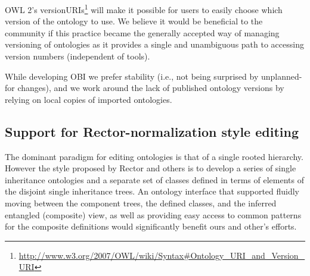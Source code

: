 \documentclass{elsart}       %
\begin{document}
OWL 2's versionURIs\footnote{\url{http://www.w3.org/2007/OWL/wiki/Syntax#Ontology_URI_and_Version_URI}} will make it possible for users to easily choose which version of the ontology to use.
We believe it would be beneficial to the community if this practice became the generally accepted way of managing versioning of ontologies as it provides a single and unambiguous path to accessing version numbers (independent of tools). 

While developing OBI we prefer stability (i.e., not being surprised by unplanned-for changes), and we work around the lack of published ontology versions by relying on local copies of imported ontologies.

\subsection{Support for Rector-normalization style editing}

The dominant paradigm for editing ontologies is that of a single rooted hierarchy.
However the style proposed by Rector and others is to develop a series of single inheritance ontologies and a separate set of classes defined in terms of elements of the disjoint single inheritance trees.
An ontology interface that supported fluidly moving between the component trees, the defined classes, and the inferred entangled (composite) view, as well as providing easy access to common patterns for the composite definitions would significantly benefit ours and other’s efforts.
\end{document}
